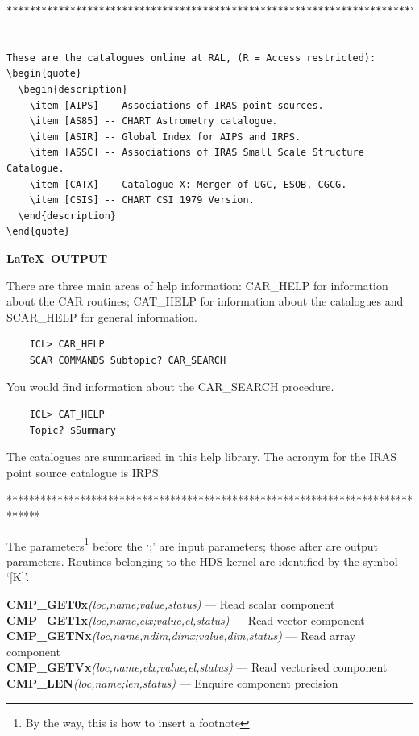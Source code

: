 \documentclass[11pt,twoside]{article}
\begin{document}
{\begin{verbatim}
******************************************************************************


These are the catalogues online at RAL, (R = Access restricted):
\begin{quote}
  \begin{description}
    \item [AIPS] -- Associations of IRAS point sources.
    \item [AS85] -- CHART Astrometry catalogue.
    \item [ASIR] -- Global Index for AIPS and IRPS.
    \item [ASSC] -- Associations of IRAS Small Scale Structure Catalogue.
    \item [CATX] -- Catalogue X: Merger of UGC, ESOB, CGCG.
    \item [CSIS] -- CHART CSI 1979 Version.
  \end{description}
\end{quote}
\end{verbatim}
}

\newpage

\begin{center}
  \textbf{\LaTeX\ OUTPUT}
\end{center}

There are three main areas of help information: CAR\_HELP for information 
about the CAR routines; CAT\_HELP for information about the catalogues and 
SCAR\_HELP for general information.
\begin{verbatim}
    ICL> CAR_HELP
    SCAR COMMANDS Subtopic? CAR_SEARCH
\end{verbatim}
You would find information about the CAR\_SEARCH procedure.
\begin{verbatim}
    ICL> CAT_HELP
    Topic? $Summary
\end{verbatim}
The catalogues are summarised in this help library.
The acronym for the IRAS point source catalogue is IRPS.


******************************************************************************

The parameters\footnote{By the way, this is how to insert a footnote} before
the `;' are input parameters; those after are output parameters.
Routines belonging to the HDS kernel are identified by the symbol `[K]'.

\noindent
\textbf{CMP\_GET0x}\emph{(loc,name;value,status)} --- Read scalar component\\
\textbf{CMP\_GET1x}\emph{(loc,name,elx;value,el,status)} --- Read vector component\\
\textbf{CMP\_GETNx}\emph{(loc,name,ndim,dimx;value,dim,status)} --- Read array 
component\\
\textbf{CMP\_GETVx}\emph{(loc,name,elx;value,el,status)} --- Read vectorised 
component\\
\textbf{CMP\_LEN}\emph{(loc,name;len,status)} --- Enquire component precision\\
\end{document}

